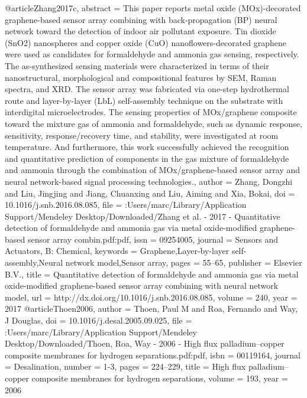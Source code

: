 @article{Zhang2017c,
abstract = {This paper reports metal oxide (MOx)-decorated graphene-based sensor array combining with back-propagation (BP) neural network toward the detection of indoor air pollutant exposure. Tin dioxide (SnO2) nanospheres and copper oxide (CuO) nanoflowers-decorated graphene were used as candidates for formaldehyde and ammonia gas sensing, respectively. The as-synthesized sensing materials were characterized in terms of their nanostructural, morphological and compositional features by SEM, Raman spectra, and XRD. The sensor array was fabricated via one-step hydrothermal route and layer-by-layer (LbL) self-assembly technique on the substrate with interdigital microelectrodes. The sensing properties of MOx/graphene composite toward the mixture gas of ammonia and formaldehyde, such as dynamic response, sensitivity, response/recovery time, and stability, were investigated at room temperature. And furthermore, this work successfully achieved the recognition and quantitative prediction of components in the gas mixture of formaldehyde and ammonia through the combination of MOx/graphene-based sensor array and neural network-based signal processing technologies.},
author = {Zhang, Dongzhi and Liu, Jingjing and Jiang, Chuanxing and Liu, Aiming and Xia, Bokai},
doi = {10.1016/j.snb.2016.08.085},
file = {:Users/marc/Library/Application Support/Mendeley Desktop/Downloaded/Zhang et al. - 2017 - Quantitative detection of formaldehyde and ammonia gas via metal oxide-modified graphene-based sensor array combin.pdf:pdf},
issn = {09254005},
journal = {Sensors and Actuators, B: Chemical},
keywords = {Graphene,Layer-by-layer self-assembly,Neural network model,Sensor array},
pages = {55--65},
publisher = {Elsevier B.V.},
title = {{Quantitative detection of formaldehyde and ammonia gas via metal oxide-modified graphene-based sensor array combining with neural network model}},
url = {http://dx.doi.org/10.1016/j.snb.2016.08.085},
volume = {240},
year = {2017}
}
@article{Thoen2006,
author = {Thoen, Paul M and Roa, Fernando and Way, J Douglas},
doi = {10.1016/j.desal.2005.09.025},
file = {:Users/marc/Library/Application Support/Mendeley Desktop/Downloaded/Thoen, Roa, Way - 2006 - High flux palladium–copper composite membranes for hydrogen separations.pdf:pdf},
isbn = {00119164},
journal = {Desalination},
number = {1-3},
pages = {224--229},
title = {{High flux palladium–copper composite membranes for hydrogen separations}},
volume = {193},
year = {2006}
}
